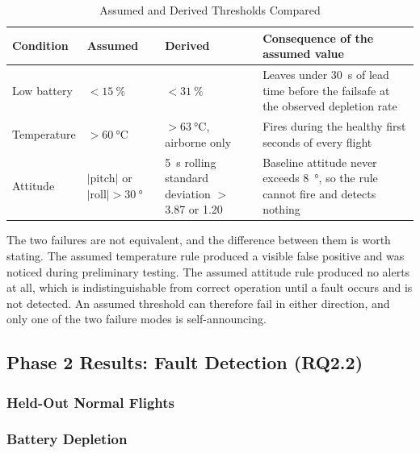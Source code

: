 \begin{table}[htbp]
\centering
\caption{Assumed and Derived Thresholds Compared}
\label{tab:assumed-vs-derived}
\small
\begin{tabular}{|p{2.6cm}|p{3.2cm}|p{3.4cm}|p{4.0cm}|}
\hline
\textbf{Condition} & \textbf{Assumed} & \textbf{Derived} & \textbf{Consequence of the assumed value} \\
\hline
Low battery & $<\SI{15}{\percent}$ & $<\SI{31}{\percent}$ &
Leaves under \SI{30}{\second} of lead time before the failsafe at the observed
depletion rate \\
\hline
Temperature & $>\SI{60}{\celsius}$ & $>\SI{63}{\celsius}$, airborne only &
Fires during the healthy first seconds of every flight \\
\hline
Attitude & $|\text{pitch}|$ or $|\text{roll}| > \SI{30}{\degree}$ &
\SI{5}{\second} rolling standard deviation $>$ 3.87 or 1.20 &
Baseline attitude never exceeds \SI{8}{\degree}, so the rule cannot fire and
detects nothing \\
\hline
\end{tabular}
\end{table}

The two failures are not equivalent, and the difference between them is worth
stating. The assumed temperature rule produced a visible false positive and was
noticed during preliminary testing. The assumed attitude rule produced no alerts
at all, which is indistinguishable from correct operation until a fault occurs
and is not detected. An assumed threshold can therefore fail in either
direction, and only one of the two failure modes is self-announcing.

\subsection{Phase 2 Results: Fault Detection (RQ2.2)}\label{sec:rq2-phase2}


\subsubsection{Held-Out Normal Flights}\label{sec:rq2-fp}


\subsubsection{Battery Depletion}\label{sec:rq2-fault-battery}

